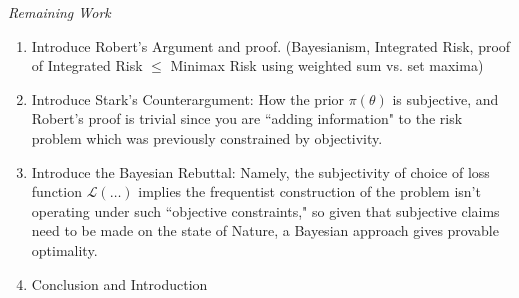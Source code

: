 \documentclass[letterpaper,12pt]{article}
\begin{document}
\textit{Remaining Work}
\begin{enumerate}\item{Introduce Robert's Argument and proof. (Bayesianism, Integrated Risk, proof of Integrated Risk $\leq$ Minimax Risk using weighted sum vs. set maxima)} 
\item{Introduce Stark's Counterargument: How the prior $\pi(\theta)$ is subjective, and Robert's proof is trivial since you are ``adding information" to the risk problem which was previously constrained by objectivity.}
\item{Introduce the Bayesian Rebuttal: Namely, the subjectivity of choice of loss function $\mathcal{L}(\dots)$ implies the frequentist construction of the problem isn't operating under such ``objective constraints," so given that subjective claims need to be made on the state of Nature, a Bayesian approach gives provable optimality. }
\item{Conclusion and Introduction }
 \end{enumerate}

  
\end{document}
